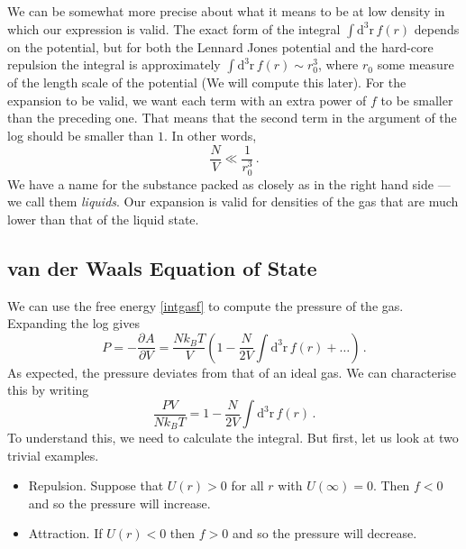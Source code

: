 \documentclass{article}
\theoremstyle{plain}\theoremheaderfont{\normalfont\bfseries}\theorembodyfont{\rmfamily}\theoremseparator{.}\newtheorem*{thm}{Theorem}\newtheorem*{law}{Law}\newtheorem*{pos}{Postulate}
\numberwithin{equation}{section}
\newcommand{\dd}[2][]{\mathrm{d}^{#1} #2\,}
\newcommand{\pdv}[3][]{\frac{\partial^{#1} #2}{{\partial #3}^{#1}}}
\newcommand{\vb}[1]{\bm{\mathrm{#1}}}
\begin{document}
    We can be somewhat more precise about what it means to be at low density in which our expression is valid. The exact form of the integral \(\int \dd[3]{\vb{r}}f(r)\) depends on the potential, but for both the Lennard Jones potential and the hard-core repulsion the integral is approximately \(\int\dd[3]{\vb{r}}f(r)\sim r_0^3\), where \(r_0\) some measure of the length scale of the potential (We will compute this later). For the expansion to be valid, we want each term with an extra power of \(f\) to be smaller than the preceding one. That means that the second term in the argument of the log should be smaller than \(1\). In other words,
    \begin{equation}
        \frac{N}{V}\ll\frac{1}{r_0^3}\,.
    \end{equation}
    We have a name for the substance packed as closely as in the right hand side --- we call them \textit{liquids}. Our expansion is valid for densities of the gas that are much lower than that of the liquid state.
    \subsection{van der Waals Equation of State}
    We can use the free energy \cref{intgasf} to compute the pressure of the gas. Expanding the log gives
    \begin{equation}
        P=-\pdv{A}{V}=\frac{Nk_BT}{V}\left(1-\frac{N}{2V}\int\dd[3]{\vb{r}}f(r)+\dots\right)\,.
    \end{equation}
    As expected, the pressure deviates from that of an ideal gas. We can characterise this by writing
    \begin{equation}\label{intgaseqstate}
        \frac{PV}{Nk_BT}=1-\frac{N}{2V}\int\dd[3]{\vb{r}}f(r)\,.
    \end{equation}
    To understand this, we need to calculate the integral. But first, let us look at two trivial examples.
    \begin{itemize}[topsep=0pt]
        \item Repulsion. Suppose that \(U(r)>0\) for all \(r\) with \(U(\infty)=0\). Then \(f<0\) and so the pressure will increase.
        \item Attraction. If \(U(r)<0\) then \(f>0\) and so the pressure will decrease.
    \end{itemize}
\end{document}
